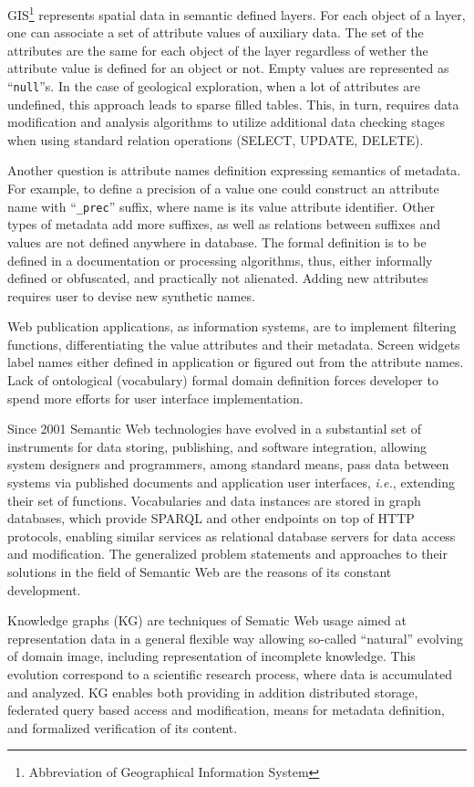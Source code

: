 \documentclass[
]{ceurart}
\begin{document}
GIS\footnote{Abbreviation of Geographical Information System} represents spatial data in semantic defined layers.  For each object of a layer, one can associate a set of attribute values of auxiliary data.  The set of the attributes are the same for each object of the layer regardless of wether the attribute value is defined for an object or not.  Empty values are represented as ``\texttt{null}''s.  In the case of geological exploration, when a lot of attributes are undefined, this approach leads to sparse filled tables.  This, in turn, requires data modification and analysis algorithms to utilize additional data checking stages when using standard relation operations (SELECT, UPDATE, DELETE).

Another question is attribute names definition expressing semantics of metadata.  For example, to define a precision of a value one could construct an attribute name with ``\texttt{\_prec}'' suffix, where name is its value attribute identifier.  Other types of metadata add more suffixes, as well as relations between suffixes and values are not defined anywhere in database.  The formal definition is to be defined in a documentation or processing algorithms, thus, either informally defined or obfuscated, and practically not alienated.  Adding new attributes requires user to devise new synthetic names.

Web publication applications, as information systems, are to implement filtering functions, differentiating the value attributes and their metadata.  Screen widgets label names either defined in application or figured out from the attribute names.  Lack of ontological (vocabulary) formal domain definition forces developer to spend more efforts for user interface implementation.

Since 2001 Semantic Web technologies have evolved in a substantial set of instruments for data storing, publishing, and software integration, allowing system designers and programmers, among standard means, pass data between systems via published documents and application user interfaces, \emph{i.e.}, extending their set of functions.  Vocabularies and data instances are stored in graph databases, which provide SPARQL and other endpoints on top of HTTP protocols, enabling similar services as relational database servers for data access and modification.  The generalized problem statements and approaches to their solutions in the field of Semantic Web are the reasons of its constant development.

Knowledge graphs (KG) \cite{hogan} are techniques of Sematic Web usage aimed at representation data in a general flexible way allowing so-called ``natural'' evolving of domain image, including representation of incomplete knowledge.  This evolution correspond to a scientific research process, where data is accumulated and analyzed.  KG enables both providing in addition distributed storage, federated query based access and modification, means for metadata definition, and formalized verification of its content.
\end{document}
